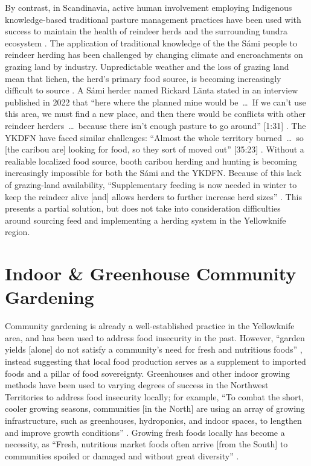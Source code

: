 \documentclass{report}
\begin{document}
\hspace{24pt} By contrast, in Scandinavia, active human involvement employing Indigenous knowledge-based traditional pasture management practices have been used with success to maintain the health of reindeer herds and the surrounding tundra ecosystem \parencite{reindeerfoodsovereignty}.
The application of traditional knowledge of the the S\'ami people to reindeer herding has been challenged by changing climate and encroachments on grazing land by industry. Unpredictable weather and the loss of grazing land mean that lichen, the herd's primary food source, is becoming increasingly difficult to source \parencite{samishiftingstrategies}.
A S\'ami herder named Rickard L\"anta stated in an interview published in 2022 that ``here where the planned mine would be~\ldots~If we can't use this area, we must find a new place, and then there would be conflicts with other reindeer herders~\ldots~because there isn't enough pasture to go around'' [1:31] \parencite{samiherders}.
The YKDFN have faced similar challenges: ``Almost the whole territory burned~\ldots~so [the caribou are] looking for food, so they sort of moved out'' [35:23] \parencite{jonassangris}. Without a realiable localized food source, booth caribou herding and hunting is becoming increasingly impossible for both the S\'ami and the YKDFN.
Because of this lack of grazing-land availability, ``Supplementary feeding is now needed in winter to keep the reindeer alive [and] allows herders to further increase herd sizes'' \parencite[35]{reindeerfoodsovereignty}. This presents a partial solution, but does not take into consideration difficulties around sourcing feed and implementing a herding system in the Yellowknife region.

\section{Indoor \& Greenhouse Community Gardening}

\hspace{24pt} Community gardening is already a well-established practice in the Yellowknife area, and has been used to address food insecurity in the past.
However, ``garden yields [alone] do not satisfy a community's need for fresh and nutritious foods'' \parencite[85]{resilientcommunities}, instead suggesting that local food production serves as a supplement to imported foods and a pillar of food sovereignty.
Greenhouses and other indoor growing methods have been used to varying degrees of success in the Northwest Territories to address food insecurity locally; for example, ``To combat the short, cooler growing seasons, communities [in the North] are using an array of growing infrastructure, such as greenhouses, hydroponics, and indoor spaces, to lengthen and improve growth conditions'' \parencite[90]{resilientcommunities}.
Growing fresh foods locally has become a necessity, as ``Fresh, nutritious market foods often arrive [from the South] to communities spoiled or damaged and without great diversity'' \parencite[85]{resilientcommunities}.
\end{document}
